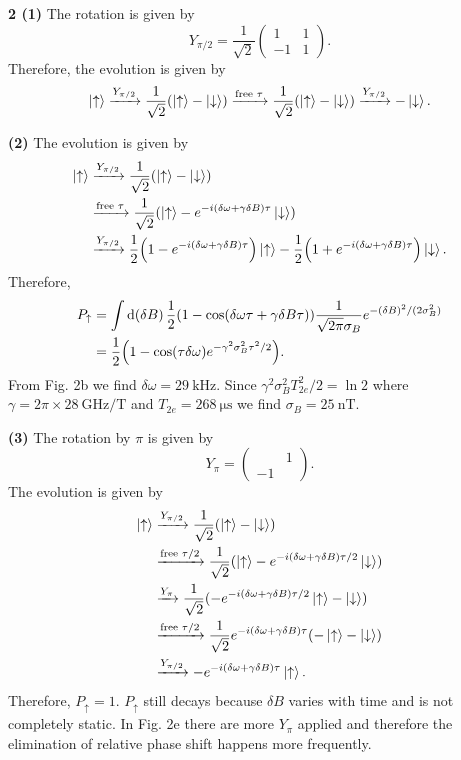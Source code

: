\documentclass{article}
\makeatletter
\newcommand*{\shifttext}[1]{%
  \settowidth{\@tempdima}{#1}%
  \hspace{-\@tempdima}#1%
}
\newcommand{\plabel}[1]{%
\shifttext{\textbf{#1}\quad}%
}
\makeatother
\begin{document}
\plabel{2 (1)}%
The rotation is given by
\[ Y_{\pi/2} = \frac{1}{\sqrt{2}} \begin{pmatrix}
    1 & 1 \\
    -1 & 1
\end{pmatrix}. \]
Therefore, the evolution is given by
\[ \ket{\uparrow} \xrightarrow{Y_{\pi/2}} \frac{1}{\sqrt{2}}(\ket{\uparrow} - \ket{\downarrow}) \xrightarrow{\text{free } \tau} \frac{1}{\sqrt{2}}(\ket{\uparrow} - \ket{\downarrow}) \xrightarrow{Y_{\pi/2}} -\ket{\downarrow}. \]

\plabel{(2)}%
The evolution is given by
\begin{align*}
    \ket{\uparrow} &\xrightarrow{Y_{\pi/2}} \frac{1}{\sqrt{2}}(\ket{\uparrow} - \ket{\downarrow}) \\
    &\xrightarrow{\text{free } \tau} \frac{1}{\sqrt{2}}(\ket{\uparrow} - e^{-i(\delta\omega+\gamma\delta B)\tau}\ket{\downarrow}) \\
    &\xrightarrow{Y_{\pi/2}} \frac{1}{2}\qty(1 - e^{-i(\delta\omega+\gamma\delta B)\tau})\ket{\uparrow} - \frac{1}{2}\qty(1 + e^{-i(\delta\omega+\gamma\delta B)\tau})\ket{\downarrow}.
\end{align*}
Therefore,
\begin{align*}
    P_\uparrow &= \int \dd{(\delta B)} \frac{1}{2}\qty(1 - \cos(\delta\omega\tau+\gamma\delta B \tau)) \frac{1}{\sqrt{2\pi}\sigma_B} e^{-(\delta B)^2 / (2 \sigma^2_B)} \\
    &= \frac{1}{2}\qty(1 - \cos(\tau \delta\omega) e^{-\gamma^2 \sigma_B^2\tau^2/2}).
\end{align*}
From Fig. 2b we find $\delta\omega = \SI{29}{\kilo\hertz}$.
Since $\gamma^2 \sigma_B^2 T_{2e}^2 / 2 = \ln 2$ where $\gamma = 2\pi \times \SI{28}{\giga\hertz/\tesla}$ and $T_{2e} = \SI{268}{\micro\second}$ we find $\sigma_B = \SI{25}{\nano\tesla}$.

\plabel{(3)}%
The rotation by $\pi$ is given by
\[ Y_\pi = \begin{pmatrix}
    & 1 \\ -1
\end{pmatrix}. \]
The evolution is given by
\begin{align*}
    \ket{\uparrow} &\xrightarrow{Y_{\pi/2}} \frac{1}{\sqrt{2}}(\ket{\uparrow} - \ket{\downarrow}) \\
    &\xrightarrow{\text{free } \tau/2} \frac{1}{\sqrt{2}}(\ket{\uparrow} - e^{-i(\delta\omega+\gamma\delta B)\tau/2}\ket{\downarrow}) \\
    &\xrightarrow{Y_\pi} \frac{1}{\sqrt{2}}(-e^{-i(\delta\omega+\gamma\delta B)\tau/2} \ket{\uparrow} - \ket{\downarrow}) \\
    &\xrightarrow{\text{free } \tau/2} \frac{1}{\sqrt{2}}e^{-i(\delta\omega+\gamma\delta B)\tau}(-\ket{\uparrow} - \ket{\downarrow}) \\
    &\xrightarrow{Y_{\pi/2}} -e^{-i(\delta\omega+\gamma\delta B)\tau}\ket{\uparrow}.
\end{align*}
Therefore, $P_\uparrow = 1$.
$P_\uparrow$ still decays because $\delta B$ varies with time and is not completely static.
In Fig. 2e there are more $Y_\pi$ applied and therefore the elimination of relative phase shift happens more frequently.
\end{document}
